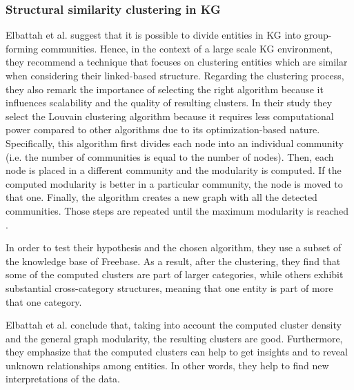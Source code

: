 \documentclass[runningheads]{llncs}
\begin{document}
\subsubsection{Structural similarity clustering in KG} \label{structural-similarity}
Elbattah et al. \cite{Elbattah} suggest that it is possible to divide entities in KG into group-forming communities. Hence, in the context of a large scale KG environment, they recommend a technique that focuses on clustering entities which are similar when considering their linked-based structure. Regarding the clustering process, they also remark the importance of selecting the right algorithm because it influences scalability and the quality of resulting clusters. In their study they select the Louvain clustering algorithm because it requires less computational power compared to other algorithms due to its optimization-based nature. Specifically, this algorithm first divides each node into an individual community (i.e. the number of communities is equal to the number of nodes). Then, each node is placed in a different community and the modularity is computed. If the computed modularity is better in a particular community, the node is moved to that one. Finally, the algorithm creates a new graph with all the detected communities. Those steps are repeated until the maximum modularity is reached \cite{Elbattah}.

In order to test their hypothesis and the chosen algorithm, they use a subset of the knowledge base of Freebase. As a result, after the clustering, they find that some of the computed clusters are part of larger categories, while others exhibit substantial cross-category structures, meaning that one entity is part of more that one category. 

Elbattah et al. \cite{Elbattah} conclude that, taking into account the computed cluster density and the general graph modularity, the resulting clusters are good. Furthermore, they emphasize that the computed clusters can help to get insights and to reveal unknown relationships among entities. In other words, they help to find new interpretations of the data.
\end{document}
